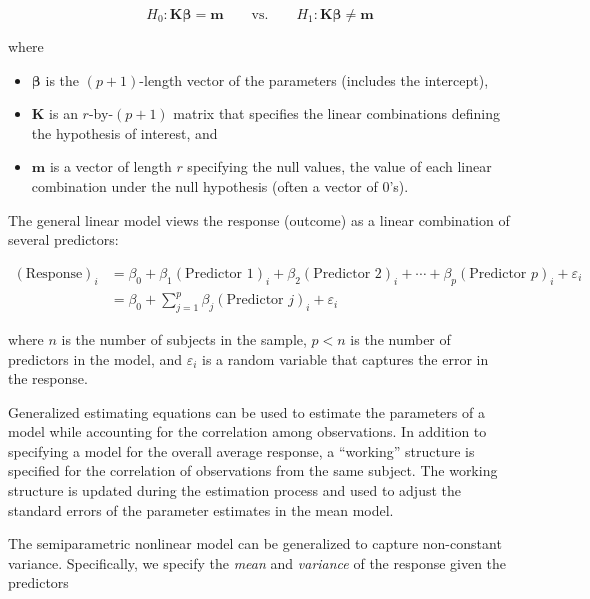 \documentclass[
  letterpaper,
  DIV=11,
  numbers=noendperiod]{scrreprt}
\providecommand{\tightlist}{%
  \setlength{\itemsep}{0pt}\setlength{\parskip}{0pt}}\usepackage{longtable,booktabs,array}
\theoremstyle{definition}
\theoremstyle{definition}
\theoremstyle{remark}
\begin{document}
\[H_0: \mathbf{K}\boldsymbol{\beta} = \mathbf{m} \qquad \text{vs.} \qquad H_1: \mathbf{K}\boldsymbol{\beta} \neq \mathbf{m}\]

where

\begin{itemize}
\tightlist
\item
  \(\boldsymbol{\beta}\) is the \((p+1)\)-length vector of the
  parameters (includes the intercept),
\item
  \(\mathbf{K}\) is an \(r\)-by-\((p+1)\) matrix that specifies the
  linear combinations defining the hypothesis of interest, and
\item
  \(\mathbf{m}\) is a vector of length \(r\) specifying the null values,
  the value of each linear combination under the null hypothesis (often
  a vector of 0's).
\end{itemize}

\begin{description}
\tightlist
\item[General Linear Model (Definition~\ref{def-general-linear-model})]
The general linear model views the response (outcome) as a linear
combination of several predictors:
\end{description}

\[
\begin{aligned}
  (\text{Response})_i 
    &= \beta_0 + \beta_1 (\text{Predictor 1})_{i} + \beta_2 (\text{Predictor 2})_{i} + \dotsb + 
      \beta_p (\text{Predictor } p)_{i} + \varepsilon_i \\
    &= \beta_0 + \sum\limits_{j=1}^{p} \beta_j (\text{Predictor } j)_{i} + \varepsilon_i
\end{aligned}
\]

where \(n\) is the number of subjects in the sample, \(p < n\) is the
number of predictors in the model, and \(\varepsilon_i\) is a random
variable that captures the error in the response.

\begin{description}
\tightlist
\item[Generalized Estimating Equations (GEE) (Definition~\ref{def-gee})]
Generalized estimating equations can be used to estimate the parameters
of a model while accounting for the correlation among observations. In
addition to specifying a model for the overall average response, a
``working'' structure is specified for the correlation of observations
from the same subject. The working structure is updated during the
estimation process and used to adjust the standard errors of the
parameter estimates in the mean model.
\item[Generalized Least Squares (Definition~\ref{def-nlm-gls})]
The semiparametric nonlinear model can be generalized to capture
non-constant variance. Specifically, we specify the \emph{mean} and
\emph{variance} of the response given the predictors
\end{description}
\end{document}
